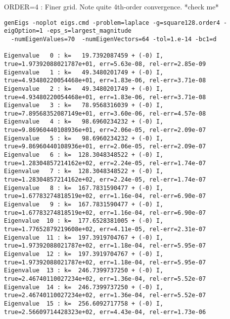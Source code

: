 \mni
ORDER=4 : Finer grid. Note quite 4th-order convergence. *check me*
\begin{Verbatim}[fontsize=\footnotesize]
 genEigs -noplot eigs.cmd -problem=laplace -g=square128.order4 -eigOption=1 -eps_s=largest_magnitude 
  -numEigenValues=70  -numEigenVectors=64 -tol=1.e-14 -bc1=d 

Eigenvalue   0 : k=   19.7392087459 + (-0) I,  true=1.97392088021787e+01, err=5.63e-08, rel-err=2.85e-09
Eigenvalue   1 : k=   49.3480201749 + (-0) I,  true=4.93480220054468e+01, err=1.83e-06, rel-err=3.71e-08
Eigenvalue   2 : k=   49.3480201749 + (-0) I,  true=4.93480220054468e+01, err=1.83e-06, rel-err=3.71e-08
Eigenvalue   3 : k=   78.9568316039 + (-0) I,  true=7.89568352087149e+01, err=3.60e-06, rel-err=4.57e-08
Eigenvalue   4 : k=   98.6960234232 + (-0) I,  true=9.86960440108936e+01, err=2.06e-05, rel-err=2.09e-07
Eigenvalue   5 : k=   98.6960234232 + (-0) I,  true=9.86960440108936e+01, err=2.06e-05, rel-err=2.09e-07
Eigenvalue   6 : k=  128.3048348522 + (-0) I,  true=1.28304857214162e+02, err=2.24e-05, rel-err=1.74e-07
Eigenvalue   7 : k=  128.3048348522 + (-0) I,  true=1.28304857214162e+02, err=2.24e-05, rel-err=1.74e-07
Eigenvalue   8 : k=  167.7831590477 + (-0) I,  true=1.67783274818519e+02, err=1.16e-04, rel-err=6.90e-07
Eigenvalue   9 : k=  167.7831590477 + (-0) I,  true=1.67783274818519e+02, err=1.16e-04, rel-err=6.90e-07
Eigenvalue  10 : k=  177.6528381005 + (-0) I,  true=1.77652879219608e+02, err=4.11e-05, rel-err=2.31e-07
Eigenvalue  11 : k=  197.3919704767 + (-0) I,  true=1.97392088021787e+02, err=1.18e-04, rel-err=5.95e-07
Eigenvalue  12 : k=  197.3919704767 + (-0) I,  true=1.97392088021787e+02, err=1.18e-04, rel-err=5.95e-07
Eigenvalue  13 : k=  246.7399737250 + (-0) I,  true=2.46740110027234e+02, err=1.36e-04, rel-err=5.52e-07
Eigenvalue  14 : k=  246.7399737250 + (-0) I,  true=2.46740110027234e+02, err=1.36e-04, rel-err=5.52e-07
Eigenvalue  15 : k=  256.6092717758 + (-0) I,  true=2.56609714428323e+02, err=4.43e-04, rel-err=1.73e-06

\end{Verbatim}



